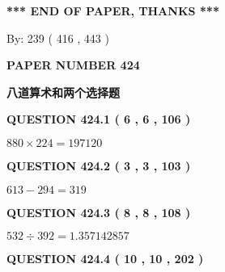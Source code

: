 \documentclass{ctexart}
\begin{document}
   
   
   
   
\vspace{1.0in} 
{\textbf{\large{ *** END OF PAPER, THANKS *** }}} 
   
   
\hspace{1.0in} By: 
 239 ( 416 ,  443 )
   
   
   
   
\newpage 
\setcounter{page}{ 
   424001 } 
   
   
   
   
 {\textbf{ \Large{ PAPER NUMBER  424  }}}
   
   
\vspace{0.2in}
   
   
   
   
   
   
 \vspace{0.2in}
{\LARGE {\textbf{ 八道算术和两个选择题}}}
   
   
  
\vspace{0.2in}
  
{\textbf{\Large{QUESTION
424.1 
 ( 6 , 6 , 106 )
}}}
  
  
 
 

$ %
880 \times  %
224=   %
197120$
 
 
  
\vspace{0.2in}
  
{\textbf{\Large{QUESTION
424.2 
 ( 3 , 3 , 103 )
}}}
  
  
 
 

$ %
613 -  %
294=   %
319$
 
 
  
\vspace{0.2in}
  
{\textbf{\Large{QUESTION
424.3 
 ( 8 , 8 , 108 )
}}}
  
  
 
 

$ %
532 \div  %
392=   %
1.357142857$
 
 
  
\vspace{0.2in}
  
{\textbf{\Large{QUESTION
424.4 
 ( 10 , 10 , 202 )
}}}
  
\end{document}

